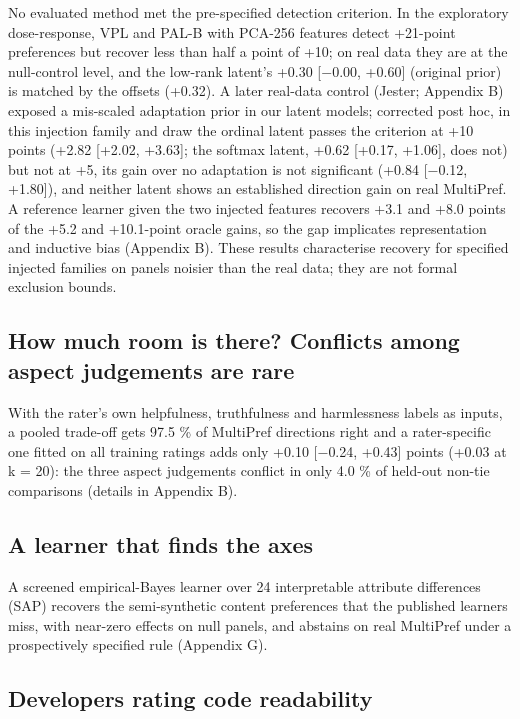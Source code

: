 \documentclass{article}
\begin{document}
No evaluated method met the pre-specified detection criterion. In the exploratory dose-response, VPL and PAL-B with PCA-256 features detect +21-point preferences but recover less than half a point of +10; on real data they are at the null-control level, and the low-rank latent's +0.30 {[}$-$0.00, +0.60{]} (original prior) is matched by the offsets (+0.32). A later real-data control (Jester; Appendix B) exposed a mis-scaled adaptation prior in our latent models; corrected post hoc, in this injection family and draw the ordinal latent passes the criterion at +10 points (+2.82 {[}+2.02, +3.63{]}; the softmax latent, +0.62 {[}+0.17, +1.06{]}, does not) but not at +5, its gain over no adaptation is not significant (+0.84 {[}$-$0.12, +1.80{]}), and neither latent shows an established direction gain on real MultiPref. A reference learner given the two injected features recovers +3.1 and +8.0 points of the +5.2 and +10.1-point oracle gains, so the gap implicates representation and inductive bias (Appendix B). These results characterise recovery for specified injected families on panels noisier than the real data; they are not formal exclusion bounds.

\subsection{How much room is there? Conflicts among aspect judgements are rare}

With the rater's own helpfulness, truthfulness and harmlessness labels as inputs, a pooled trade-off gets 97.5 \% of MultiPref directions right and a rater-specific one fitted on all training ratings adds only +0.10 {[}$-$0.24, +0.43{]} points (+0.03 at k = 20): the three aspect judgements conflict in only 4.0 \% of held-out non-tie comparisons (details in Appendix B).

\subsection{A learner that finds the axes}

A screened empirical-Bayes learner over 24 interpretable attribute differences (SAP) recovers the semi-synthetic content preferences that the published learners miss, with near-zero effects on null panels, and abstains on real MultiPref under a prospectively specified rule (Appendix G).

\subsection{Developers rating code readability}
\end{document}
